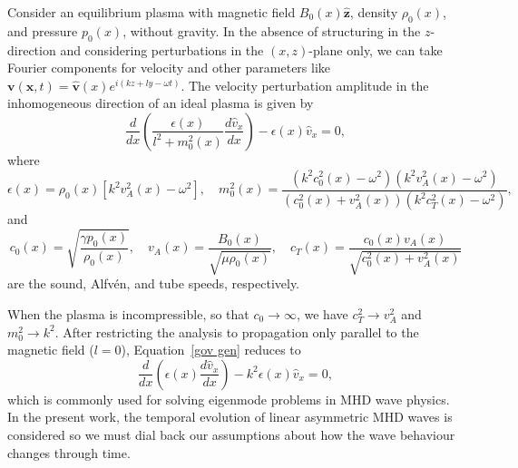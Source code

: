 \documentclass{aastex61}
\begin{document}
Consider an equilibrium plasma with magnetic field $B_0(x)\mathbf{\hat{z}}$, density $\rho_0(x)$, and pressure $p_0(x)$, without gravity. In the absence of structuring in the $z$-direction and considering perturbations in the $(x,z)$-plane only, we can take Fourier components for velocity and other parameters like $\mathbf{v}(\mathbf{x},t) = \mathbf{\hat{v}}(x)e^{i(kz + ly - \omega t)}$. The velocity perturbation amplitude in the inhomogeneous direction of an ideal plasma is given by
\begin{equation}
\frac{d}{dx}\left(\frac{\epsilon(x)}{l^2 + m_0^2(x)} \frac{d\hat{v}_x}{dx}\right) - \epsilon(x)\hat{v}_x = 0,
\label{gov gen}
\end{equation}
where
\begin{equation}
\epsilon(x) = \rho_0(x)[k^2v_A^2(x)-\omega^2], \quad
m_0^2(x) = \frac{(k^2c_0^2(x) - \omega^2)(k^2v_A^2(x) - \omega^2)}{(c_0^2(x) + v_A^2(x))(k^2c_T^2(x) - \omega^2)},
\end{equation}
and
\begin{equation}
c_0(x) = \sqrt{\frac{\gamma p_0(x)}{\rho_0(x)}}, \quad
v_A(x) = \frac{B_0(x)}{\sqrt{\mu \rho_0(x)}}, \quad
c_T(x) = \frac{c_0(x)v_A(x)}{\sqrt{c_0^2(x) + v_A^2(x)}}
\end{equation} are the sound, Alfv\'{e}n, and tube speeds, respectively.

When the plasma is incompressible, so that $c_0 \to \infty$, we have $c_T^2 \to v_A^2$ and $m_0^2 \to k^2$. After restricting the analysis to propagation only parallel to the magnetic field ($l = 0$), Equation~\eqref{gov gen} reduces to
\begin{equation}
\frac{d}{dx}\left(\epsilon(x) \frac{d\hat{v}_x}{dx}\right) - k^2\epsilon(x)\hat{v}_x = 0,
\label{gov}
\end{equation}
which is commonly used for solving eigenmode problems in MHD wave physics. In the present work, the temporal evolution of linear asymmetric MHD waves is considered so we must dial back our assumptions about how the wave behaviour changes through time.
\end{document}
